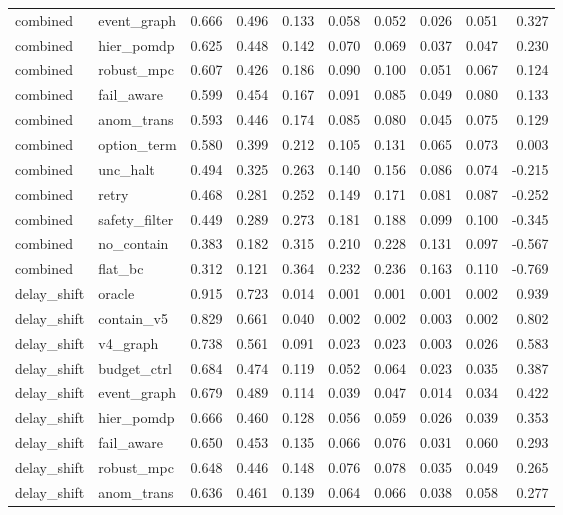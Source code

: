 \documentclass{article}
\begin{document}
\begin{longtable}{@{}llrrrrrrrr@{}}
combined & event\_graph & 0.666 & 0.496 & 0.133 & 0.058 & 0.052 & 0.026 & 0.051 & 0.327 \\
combined & hier\_pomdp & 0.625 & 0.448 & 0.142 & 0.070 & 0.069 & 0.037 & 0.047 & 0.230 \\
combined & robust\_mpc & 0.607 & 0.426 & 0.186 & 0.090 & 0.100 & 0.051 & 0.067 & 0.124 \\
combined & fail\_aware & 0.599 & 0.454 & 0.167 & 0.091 & 0.085 & 0.049 & 0.080 & 0.133 \\
combined & anom\_trans & 0.593 & 0.446 & 0.174 & 0.085 & 0.080 & 0.045 & 0.075 & 0.129 \\
combined & option\_term & 0.580 & 0.399 & 0.212 & 0.105 & 0.131 & 0.065 & 0.073 & 0.003 \\
combined & unc\_halt & 0.494 & 0.325 & 0.263 & 0.140 & 0.156 & 0.086 & 0.074 & -0.215 \\
combined & retry & 0.468 & 0.281 & 0.252 & 0.149 & 0.171 & 0.081 & 0.087 & -0.252 \\
combined & safety\_filter & 0.449 & 0.289 & 0.273 & 0.181 & 0.188 & 0.099 & 0.100 & -0.345 \\
combined & no\_contain & 0.383 & 0.182 & 0.315 & 0.210 & 0.228 & 0.131 & 0.097 & -0.567 \\
combined & flat\_bc & 0.312 & 0.121 & 0.364 & 0.232 & 0.236 & 0.163 & 0.110 & -0.769 \\
delay\_shift & oracle & 0.915 & 0.723 & 0.014 & 0.001 & 0.001 & 0.001 & 0.002 & 0.939 \\
delay\_shift & contain\_v5 & 0.829 & 0.661 & 0.040 & 0.002 & 0.002 & 0.003 & 0.002 & 0.802 \\
delay\_shift & v4\_graph & 0.738 & 0.561 & 0.091 & 0.023 & 0.023 & 0.003 & 0.026 & 0.583 \\
delay\_shift & budget\_ctrl & 0.684 & 0.474 & 0.119 & 0.052 & 0.064 & 0.023 & 0.035 & 0.387 \\
delay\_shift & event\_graph & 0.679 & 0.489 & 0.114 & 0.039 & 0.047 & 0.014 & 0.034 & 0.422 \\
delay\_shift & hier\_pomdp & 0.666 & 0.460 & 0.128 & 0.056 & 0.059 & 0.026 & 0.039 & 0.353 \\
delay\_shift & fail\_aware & 0.650 & 0.453 & 0.135 & 0.066 & 0.076 & 0.031 & 0.060 & 0.293 \\
delay\_shift & robust\_mpc & 0.648 & 0.446 & 0.148 & 0.076 & 0.078 & 0.035 & 0.049 & 0.265 \\
delay\_shift & anom\_trans & 0.636 & 0.461 & 0.139 & 0.064 & 0.066 & 0.038 & 0.058 & 0.277 \\

\end{longtable}
\end{document}
